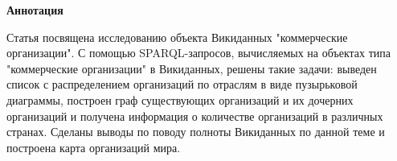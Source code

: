 \textbf{Аннотация}

Статья посвящена исследованию объекта Викиданных "коммерческие организации". С помощью SPARQL-запросов, вычисляемых на объектах типа "коммерческие организации" в Викиданных, решены такие задачи: выведен список с распределением организаций по отраслям в виде пузырьковой диаграммы, построен граф существующих организаций и их дочерних организаций и получена информация о количестве организаций в различных странах. Сделаны выводы по поводу полноты Викиданных по данной теме и построена карта организаций мира.